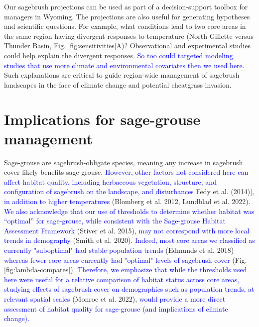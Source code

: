\documentclass[
  12pt,
]{article}
\begin{document}
Our sagebrush projections can be used as part of a decision-support toolbox for managers in Wyoming.
The projections are also useful for generating hypotheses and scientific questions.
For example, what conditions lead to two core areas in the same region having divergent responses to temperature (North Gillette versus Thunder Basin, Fig. \ref{fig:sensitivities}A)?
Observational and experimental studies could help explain the divergent responses.
\textcolor{blue}{So too could targeted modeling studies that use more climate and environmental covariates then we used here.}
Such explanations are critical to guide region-wide management of sagebrush landscapes in the face of climate change and potential cheatgrass invasion.

\hypertarget{implications-for-sage-grouse-management}{%
\section{Implications for sage-grouse management}\label{implications-for-sage-grouse-management}}

Sage-grouse are sagebrush-obligate species, meaning any increase in sagebrush cover likely benefits sage-grouse.
\textcolor{blue}{However, other factors not considered here can affect habitat quality, including herbaceous vegetation, structure, and configuration of sagebrush on the landscape, and disturbances} Fedy et al. (2014){]}, \textcolor{blue}{in addition to higher temperatures} (Blomberg et al. 2012, Lundblad et al. 2022).
\textcolor{blue}{We also acknowledge that our use of thresholds to determine whether habitat was ``optimal'' for sage-grouse, while consistent with the Sage-grouse Habitat Assessment Framework} (Stiver et al. 2015), \textcolor{blue}{may not correspond with more local trends in demography} (Smith et al. 2020).
\textcolor{blue}{Indeed, most core areas we classified as currently "suboptimal" had stable population trends} (Edmunds et al. 2018) \textcolor{blue}{whereas fewer core areas currently had "optimal" levels of sagebrush cover} (Fig. \ref{fig:lambda-compares}).
\textcolor{blue}{Therefore, we emphasize that while the thresholds used here were useful for a relative comparison of habitat status across core areas, studying effects of sagebrush cover on demographics such as population trends, at relevant spatial scales} (Monroe et al. 2022), \textcolor{blue}{would provide a more direct assessment of habitat quality for sage-grouse (and implications of climate change).}
\end{document}

